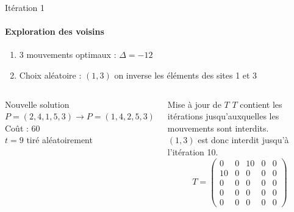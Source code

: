 \documentclass[10pt, handout]{beamer}
\begin{document}
\begin{frame}{Itération 1 }
    \framesubtitle{Exploration des voisins}


    \begin{enumerate}
        \item 3 mouvements optimaux : \( \Delta = -12 \)
        \item Choix aléatoire : \( (1,3) \) on inverse les éléments des sites 1 et 3
    \end{enumerate}

    \begin{columns}
        \begin{alertblock}{Nouvelle solution}
            \( P = (2, 4, 1, 5, 3) \rightarrow P = (1, 4, 2, 5, 3) \) \\
            Coût : 60 \\
            \( t = 9 \) tiré aléatoirement
        \end{alertblock}

        \begin{exampleblock}{Mise à jour de \( T \)}
            $T$ contient les itérations jusqu’auxquelles les mouvements sont interdits. \\
            \( (1,3) \) est donc interdit jusqu'à l'itération 10. \\
            \[
                T = \begin{pmatrix}
                    0  & 0 & 10 & 0 & 0 \\
                    10 & 0 & 0  & 0 & 0 \\
                    0  & 0 & 0  & 0 & 0 \\
                    0  & 0 & 0  & 0 & 0 \\
                    0  & 0 & 0  & 0 & 0
                \end{pmatrix}
            \]
        \end{exampleblock}
    \end{columns}
\end{frame}
\end{document}
